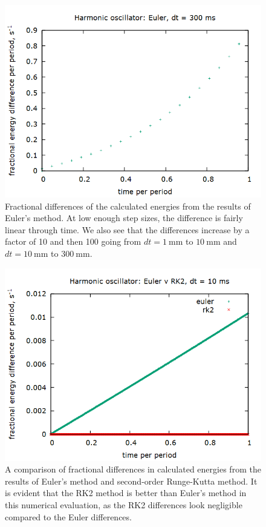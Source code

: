\documentclass[aps,prl,twocolumn,superscriptaddress]{revtex4-1}
\begin{document}
\begin{figure}[htbp]
\begin{center}
 		\includegraphics[scale=0.3]{h300.png}
  		\caption{Fractional differences of the calculated energies from the results of Euler's method. At low enough step sizes, the difference is fairly linear through time. We also see that the differences increase by a factor of 10 and then 100 going from $dt = \SI{1}{\mm}$ to $\SI{10}{\mm}$ and $dt = \SI{10}{\mm}$ to $\SI{300}{\mm}$.}
  		\label{gr:hdE}
 	\end{center}
\end{figure}

\begin{figure}[htbp]
  	\begin{center}
 		\includegraphics[scale=0.3]{ev2.png}
  		\caption{A comparison of fractional differences in calculated energies from the results of Euler's method and second-order Runge-Kutta method. It is evident that the RK2 method is better than Euler's method in this numerical evaluation, as the RK2 differences look negligible compared to the Euler differences.}
  		\label{gr:ev2}
 	\end{center}
\end{figure}
\end{document}

